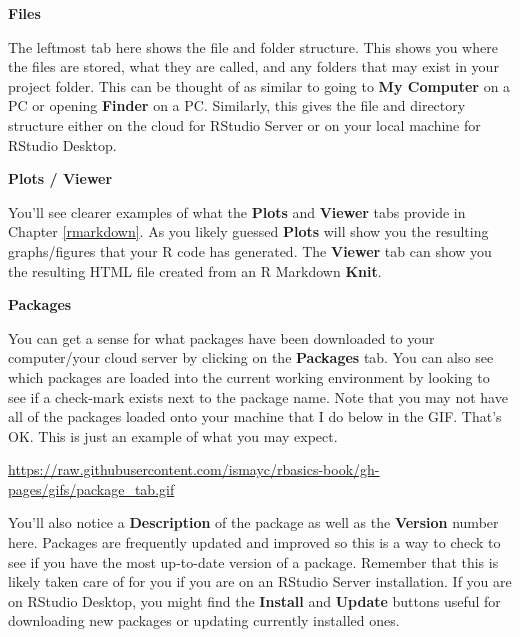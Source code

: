 \documentclass[]{tufte-book}
\begin{document}
\vspace*{0.2in}

\noindent\textbf{Files}\vspace*{0.1in}

The leftmost tab here shows the file and folder structure. This shows
you where the files are stored, what they are called, and any folders
that may exist in your project folder. This can be thought of as similar
to going to \textbf{My Computer} on a PC or opening \textbf{Finder} on a
PC. Similarly, this gives the file and directory structure either on the
cloud for RStudio Server or on your local machine for RStudio Desktop.

\vspace*{0.2in}

\noindent\textbf{Plots / Viewer}\vspace*{0.1in}

You'll see clearer examples of what the \textbf{Plots} and
\textbf{Viewer} tabs provide in Chapter \ref{rmarkdown}. As you likely
guessed \textbf{Plots} will show you the resulting graphs/figures that
your R code has generated. The \textbf{Viewer} tab can show you the
resulting HTML file created from an R Markdown \textbf{Knit}.

\vspace*{0.2in}

\noindent\textbf{Packages}\vspace*{0.1in}

You can get a sense for what packages have been downloaded to your
computer/your cloud server by clicking on the \textbf{Packages} tab. You
can also see which packages are loaded into the current working
environment by looking to see if a check-mark exists next to the package
name. Note that you may not have all of the packages loaded onto your
machine that I do below in the GIF. That's OK. This is just an example
of what you may expect.

\vspace{0.1in}

\begin{center}\footnotesize{\url{https://raw.githubusercontent.com/ismayc/rbasics-book/gh-pages/gifs/package_tab.gif}}\end{center}

\vspace{0.1in}

You'll also notice a \textbf{Description} of the package as well as the
\textbf{Version} number here. Packages are frequently updated and
improved so this is a way to check to see if you have the most
up-to-date version of a package. Remember that this is likely taken care
of for you if you are on an RStudio Server installation. If you are on
RStudio Desktop, you might find the \textbf{Install} and \textbf{Update}
buttons useful for downloading new packages or updating currently
installed ones.
\end{document}
